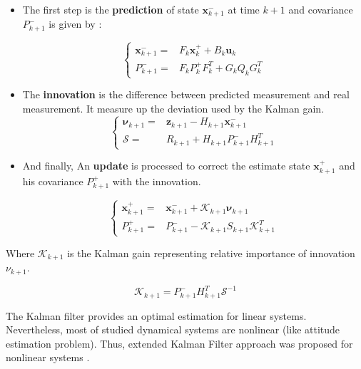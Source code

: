 \begin{itemize}
\item The first step is the \textbf{prediction} of state $\textbf{x}^-_{k+1}$ at time $k+1$ and covariance $P^-_{k+1}$ is given by :

\begin{equation}
\left\{ \begin{array}{cl}
\textbf{x}^-_{k+1} = & F_{k}\textbf{x}^+_{k} + B_{k}\textbf{u}_{k} \\
P^-_{k+1} = & F_{k}P^+_{k}F^T_{k}+G_{k}Q_{k}G^T_{k}
\end{array}
\right.
\end{equation}

\item The \textbf{innovation} is the difference between predicted measurement and real measurement. It measure up the deviation used by the Kalman gain.
\begin{equation}
\left\{ \begin{array}{cl}
\boldsymbol\nu_{k+1} = & \textbf{z}_{k+1}-H_{k+1}\textbf{x}^-_{k+1} \\
\mathcal{S} = & R_{k+1} +H_{k+1}P^-_{k+1}H^T_{k+1}
\end{array}
\right.
\end{equation}

\item And finally, An \textbf{update} is processed to correct the estimate state $\textbf{x}^+_{k+1} $ and his covariance $P^+_{k+1}$ with the innovation.

\begin{equation}
\left\{ \begin{array}{cl}
\textbf{x}^+_{k+1} = & \textbf{x}^-_{k+1} + \mathcal{K}_{k+1}\boldsymbol\nu_{k+1} \\
P^+_{k+1} = &P^-_{k+1} - \mathcal{K}_{k+1}S_{k+1}\mathcal{K}^T_{k+1}
\end{array}
\right.
\end{equation}

\end{itemize}

Where $\mathcal{K}_{k+1}$ is the Kalman gain  representing relative importance of innovation  $\nu_{k+1}$. 

\begin{equation}
\mathcal{K}_{k+1}=P^-_{k+1}H^T_{k+1}\mathcal{S}^{-1}
\end{equation}

The Kalman filter provides an optimal estimation for linear systems. Nevertheless, most of studied dynamical systems are nonlinear (like attitude estimation problem). Thus, extended Kalman Filter approach  was proposed for nonlinear systems \cite{larson1967application, larson1967precomputation,terejanu2008extended}. 

